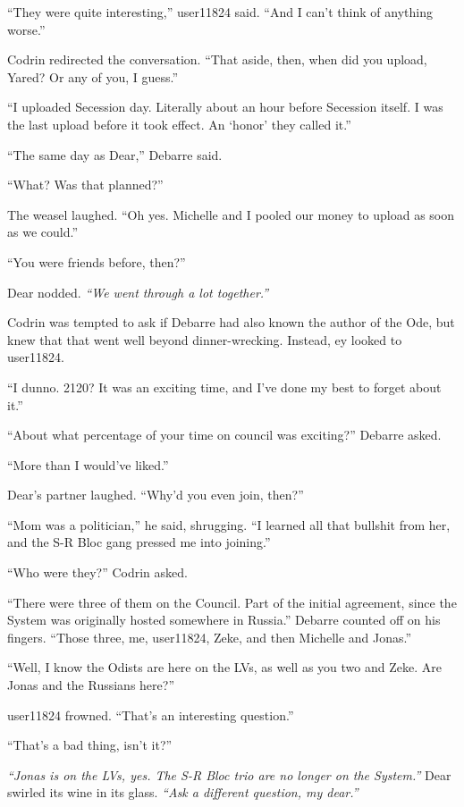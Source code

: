 ``They were quite interesting,'' user11824 said. ``And I can't think of anything worse.''

Codrin redirected the conversation. ``That aside, then, when did you upload, Yared? Or any of you, I guess.''

``I uploaded Secession day. Literally about an hour before Secession itself. I was the last upload before it took effect. An `honor' they called it.''

``The same day as Dear,'' Debarre said.

``What? Was that planned?''

The weasel laughed. ``Oh yes. Michelle and I pooled our money to upload as soon as we could.''

``You were friends before, then?''

Dear nodded. \emph{``We went through a lot together.''}

Codrin was tempted to ask if Debarre had also known the author of the Ode, but knew that that went well beyond dinner-wrecking. Instead, ey looked to user11824.

``I dunno. 2120? It was an exciting time, and I've done my best to forget about it.''

``About what percentage of your time on council was exciting?'' Debarre asked.

``More than I would've liked.''

Dear's partner laughed. ``Why'd you even join, then?''

``Mom was a politician,'' he said, shrugging. ``I learned all that bullshit from her, and the S-R Bloc gang pressed me into joining.''

``Who were they?'' Codrin asked.

``There were three of them on the Council. Part of the initial agreement, since the System was originally hosted somewhere in Russia.'' Debarre counted off on his fingers. ``Those three, me, user11824, Zeke, and then Michelle and Jonas.''

``Well, I know the Odists are here on the LVs, as well as you two and Zeke. Are Jonas and the Russians here?''

user11824 frowned. ``That's an interesting question.''

``That's a bad thing, isn't it?''

\emph{``Jonas is on the LVs, yes. The S-R Bloc trio are no longer on the System.''} Dear swirled its wine in its glass. \emph{``Ask a different question, my dear.''}

